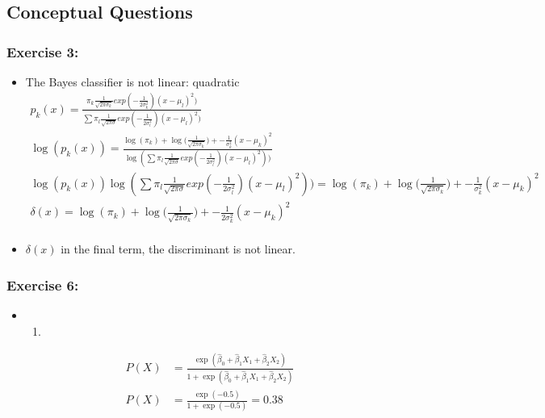 \documentclass[
]{article}
\providecommand{\tightlist}{%
  \setlength{\itemsep}{0pt}\setlength{\parskip}{0pt}}
\begin{document}
\hypertarget{conceptual-questions}{%
\subsection{Conceptual Questions}\label{conceptual-questions}}

\hypertarget{exercise-3}{%
\subsubsection{Exercise 3:}\label{exercise-3}}

\begin{itemize}
\item
  The Bayes classifier is not linear: quadratic \[\begin{aligned}
   p_k(x)=\frac{\pi_k\frac{1}{\sqrt{2\pi\sigma_k}}exp(-\frac{1}{2\sigma^2_k})(x-\mu_l)^2)}{\sum\pi_l\frac{1}{\sqrt{2\pi\sigma}}exp(-\frac{1}{2\sigma^2_l})(x-\mu_l)^2)}\\   
   \log{(p_k(x))}=\frac{\log{(\pi_k)}+\log{(\frac{1}{\sqrt{2\pi\sigma_k}}})+-\frac{1}{\sigma^2_k}(x-\mu_k)^2}{\log(\sum\pi_l\frac{1}{\sqrt{2\pi\sigma}}exp(-\frac{1}{2\sigma^2_l})(x-\mu_l)^2))}\\
   \log{(p_k(x))\log(\sum\pi_l\frac{1}{\sqrt{2\pi\sigma}}exp(-\frac{1}{2\sigma^2_l})(x-\mu_l)^2))=\log(\pi_k)+\log{(\frac{1}{\sqrt{2\pi\sigma_k}}})+-\frac{1}{\sigma^2_k}(x-\mu_k)^2}\\
   \delta(x)=\log(\pi_k)+\log{(\frac{1}{\sqrt{2\pi\sigma_k}}})+-\frac{1}{2\sigma^2_k}(x-\mu_k)^2\\
  \end{aligned}\]
\item
  \(\delta(x)\) in the final term, the discriminant is not linear.
\end{itemize}

\hypertarget{exercise-6}{%
\subsubsection{Exercise 6:}\label{exercise-6}}

\begin{itemize}
\item
  \begin{enumerate}
  \def\labelenumi{\alph{enumi})}
  \tightlist
  \item
  \end{enumerate}
\end{itemize}

\[
\begin{aligned}
P(X) &= \frac{\exp(\hat\beta_0 + \hat\beta_1X_1 + \hat\beta_2X_2)}{1 + \exp(\hat\beta_0 + \hat\beta_1X_1 + \hat\beta_2X_2)}\\
P(X) &= \frac{\exp(-0.5)}{1+\exp(-0.5)} = 0.38 
\end{aligned}
\]
\end{document}
